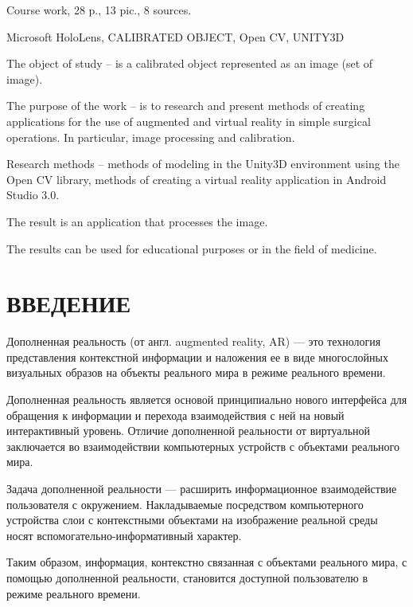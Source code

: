 \documentclass[a4paper, 14pt]{extreport} %
\begin{document}

	Course work, 28 p., 13 pic., 8 sources.

	Microsoft HoloLens, CALIBRATED OBJECT, Open CV, UNITY3D
	
	The object of study – is a calibrated object represented as an image (set of image).
	
	The purpose of the work – is to research and present methods of creating applications for the use of augmented and virtual reality in simple surgical operations. In particular, image processing and calibration.
	
	Research methods – methods of modeling in the Unity3D environment using the Open CV library, methods of creating a virtual reality application in Android Studio 3.0.
	
	The result is an application that processes the image.
	
	The results can be used for educational purposes or in the field of medicine.
	
\newpage

\renewcommand\contentsname{Оглавление} 
\tableofcontents

\chapter*{ВВЕДЕНИЕ}

Дополненная реальность (от англ. augmented reality, AR) — это технология представления контекстной информации и наложения ее в виде многослойных визуальных образов на объекты реального мира в режиме реального времени.
 
Дополненная реальность является основой принципиально нового интерфейса для обращения к информации и перехода взаимодействия с ней на новый интерактивный уровень. Отличие дополненной реальности от виртуальной заключается во взаимодействии компьютерных устройств с объектами реального мира.
 
Задача дополненной реальности — расширить информационное взаимодействие пользователя с окружением. Накладываемые посредством компьютерного устройства слои с контекстными объектами на изображение реальной среды носят вспомогательно-информативный характер.

Таким образом, информация, контекстно связанная с объектами реального мира, с помощью дополненной реальности, становится доступной пользователю в режиме реального времени.
 
\end{document}
